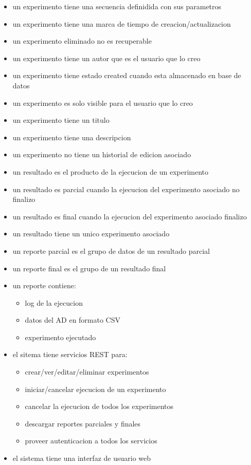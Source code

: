 \begin{itemize}
\item un experimento tiene una secuencia definidida con sus parametros
\item un experimento tiene una marca de tiempo de creacion/actualizacion
\item un experimento eliminado no es recuperable
\item un experimento tiene un autor que es el usuario que lo creo
\item un experimento tiene estado created cuando esta almacenado en base de datos
\item un experimento es solo visible para el usuario que lo creo
\item un experimento tiene un titulo
\item un experimento tiene una descripcion
\item un experimento no tiene un historial de edicion asociado
\end{itemize}

\begin{itemize}
\item un resultado es el producto de la ejecucion de un experimento
\item un resultado es parcial cuando la ejecucion del experimento asociado no finalizo
\item un resultado es final cuando la ejecucion del experimento asociado finalizo
\item un resultado tiene un unico experimento asociado
\end{itemize}

\begin{itemize}
\item un reporte parcial es el grupo de datos de un resultado parcial
\item un reporte final es el grupo de un resultado final
\item un reporte contiene:
    \begin{itemize}
    \item log de la ejecucion
    \item datos del AD en formato CSV
    \item experimento ejecutado
    \end{itemize}
\end{itemize}
\begin{itemize}
\item el sitema tiene servicios REST para:
    \begin{itemize}
    \item crear/ver/editar/eliminar experimentos
    \item iniciar/cancelar ejecucion de un experimento
    \item cancelar la ejecucion de todos los experimentos
    \item descargar reportes parciales y finales
    \item proveer autenticacion a todos los servicios
    \end{itemize}
\end{itemize}
\begin{itemize}
\item el sistema tiene una interfaz de usuario web
\end{itemize}
\newpage